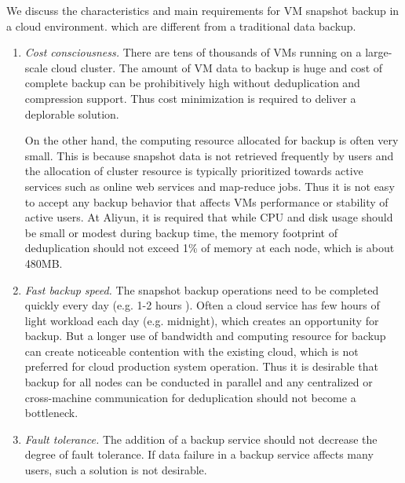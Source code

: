 We discuss the characteristics and 
main requirements for VM snapshot backup in a cloud environment.
which are different from a traditional data backup. 
\begin{enumerate}
\item {\em Cost consciousness.}
There are tens of thousands of VMs running on a large-scale cloud cluster. 
The amount of VM data to backup is huge and cost of complete backup can be prohibitively high without
deduplication and compression support.  Thus cost minimization is required to deliver a deplorable solution.

On the other hand, the computing resource allocated for backup is often very small.
This is because snapshot data is not retrieved frequently by users and the allocation of  cluster resource
is typically prioritized towards active services such as online web services and map-reduce jobs.
Thus  it is not easy to accept any backup behavior that affects VMs performance or stability of active users.  
At Aliyun, it is required that while CPU and disk usage should be  small or modest during backup time,
the memory footprint of deduplication should not exceed 1\% of memory at each node, which is about 480MB.

\item {\em Fast backup speed.}
The snapshot  backup  operations need to be completed quickly  every day (e.g. 1-2 hours ). 
Often a cloud service has  few hours of light workload each day (e.g. midnight),  which creates an opportunity  for backup.
But a  longer use of bandwidth and computing resource  for backup can create  noticeable  contention with the existing cloud,
which is not preferred for cloud production system operation. Thus it is desirable that backup for all nodes
can be conducted in parallel and any centralized or  cross-machine communication for
deduplication should not become a bottleneck.

\item {\em Fault tolerance.}
The addition of a backup service should not decrease the degree of
fault tolerance.  If data failure in  a backup service  affects many users,  such a solution is not desirable.
\end{enumerate}

